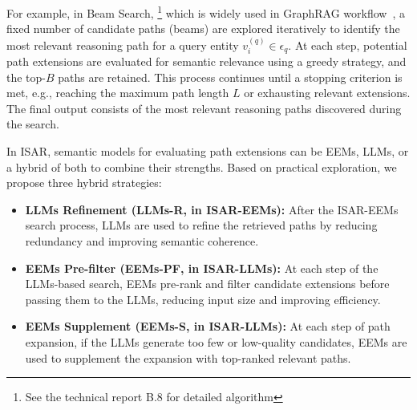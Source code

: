 {For example, in Beam Search, \footnote{See the technical report B.8 for detailed algorithm} which is widely used in GraphRAG workflow~\cite{UHop,ToG}, a fixed number of candidate paths (beams) are explored iteratively to identify the most relevant reasoning path for a query entity $v_i^{(q)} \in \epsilon_q$.
At each step, potential path extensions are evaluated for semantic relevance using a greedy strategy, and the top-$B$ paths are retained. This process continues until a stopping criterion is met, e.g., reaching the maximum path length $L$ or exhausting relevant extensions. The final output consists of the most relevant reasoning paths discovered during the search.

In ISAR, semantic models for evaluating path extensions can be EEMs, LLMs, or a hybrid of both to combine their strengths. Based on practical exploration, we propose three hybrid strategies:
\begin{itemize}[leftmargin=10pt]
\item  {\bf LLMs Refinement (LLMs-R, in ISAR-EEMs):} After the ISAR-EEMs search process, LLMs are used to refine the retrieved paths by reducing redundancy and improving semantic coherence.
     
\item {\bf EEMs Pre-filter (EEMs-PF, in ISAR-LLMs):} At each step of the LLMs-based search, EEMs pre-rank and filter candidate extensions before passing them to the LLMs, reducing input size and improving efficiency.
    
\item {\bf EEMs Supplement (EEMs-S, in ISAR-LLMs):} At each step of path expansion, if the LLMs generate too few or low-quality candidates, EEMs are used to supplement the expansion with top-ranked relevant paths. 
\end{itemize}



}
